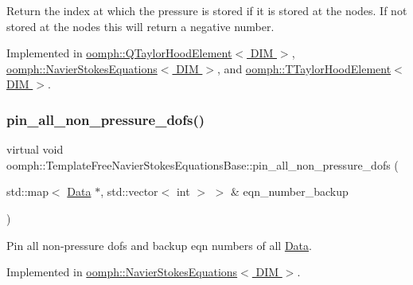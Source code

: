 Return the index at which the pressure is stored if it is stored at the nodes. If not stored at the nodes this will return a negative number. 



Implemented in \hyperlink{classoomph_1_1QTaylorHoodElement_a86f85131d3383d74ab40dfdb2213d8d5}{oomph\+::\+Q\+Taylor\+Hood\+Element$<$ D\+I\+M $>$}, \hyperlink{classoomph_1_1NavierStokesEquations_a3694d3e2f09259cfda71547259f031ed}{oomph\+::\+Navier\+Stokes\+Equations$<$ D\+I\+M $>$}, and \hyperlink{classoomph_1_1TTaylorHoodElement_abbf584f29e53f15d5b0b263882138eac}{oomph\+::\+T\+Taylor\+Hood\+Element$<$ D\+I\+M $>$}.

\mbox{\label{classoomph_1_1TemplateFreeNavierStokesEquationsBase_a4db23eff5a82f7b8478c7f9d21857d0a}} 
\subsubsection{\texorpdfstring{pin\+\_\+all\+\_\+non\+\_\+pressure\+\_\+dofs()}{pin\_all\_non\_pressure\_dofs()}}
{\footnotesize\ttfamily virtual void oomph\+::\+Template\+Free\+Navier\+Stokes\+Equations\+Base\+::pin\+\_\+all\+\_\+non\+\_\+pressure\+\_\+dofs (\begin{DoxyParamCaption}\item[{std\+::map$<$ \hyperlink{classoomph_1_1Data}{Data} $\ast$, std\+::vector$<$ int $>$ $>$ \&}]{eqn\+\_\+number\+\_\+backup }\end{DoxyParamCaption})\hspace{0.3cm}{\ttfamily [pure virtual]}}



Pin all non-\/pressure dofs and backup eqn numbers of all \hyperlink{classoomph_1_1Data}{Data}. 



Implemented in \hyperlink{classoomph_1_1NavierStokesEquations_ae3a5de7bed7c884731e3bb2afc437758}{oomph\+::\+Navier\+Stokes\+Equations$<$ D\+I\+M $>$}.



